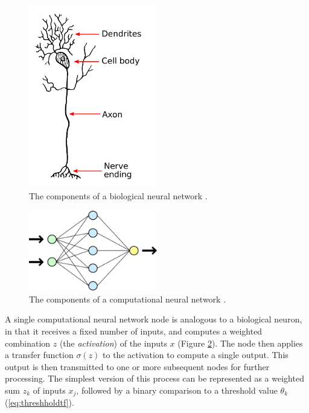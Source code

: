 \documentclass{article}
\begin{document}
\begin{figure}
  \centering
  \includegraphics[width=0.5\textwidth]{Dendrite.png}
  \caption{The components of a biological neural network \cite{bionn}.}
  \label{fig:BioNN}
\end{figure}

\begin{figure}
  \centering
  \includegraphics[width=0.5\textwidth]{NeuralNetwork.png}
  \caption{The components of a computational neural network \cite{compnn}.}
  \label{fig:CompNN}
\end{figure}

A single computational neural network node is analogous to a biological neuron, in that it receives a fixed number of inputs, and computes a weighted combination $z$ (the \emph{activation}) of the inputs $x$ (Figure \ref{fig:CompNN}). The node then applies a transfer function $\sigma(z)$ to the activation to compute a single output. This output is then transmitted to one or more subsequent nodes for further processing. The simplest version of this process can be represented as a weighted sum $z_k$ of inputs $x_j$, followed by a binary comparison to a threshold value $\theta_k$ (\ref{eq:threshholdtf}).
\end{document}
